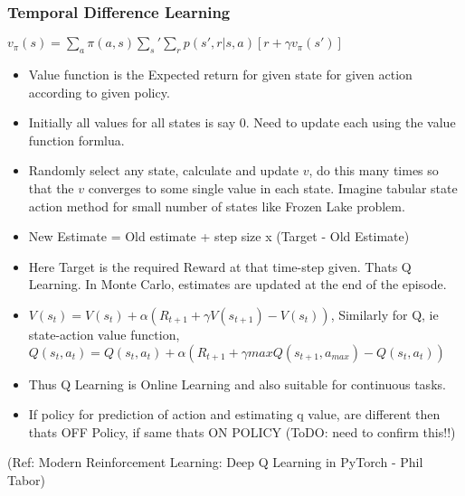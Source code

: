 \begin{frame}[fragile]\frametitle{Temporal Difference Learning}

$v_{\pi}(s) = \sum_a \pi(a,s) \sum_s' \sum_r p(s',r|s,a) [r + \gamma v_{\pi}(s')]$

\begin{itemize}
\item Value function is the Expected return for given state for given action according to given policy.
\item Initially all values for all states is say 0. Need to update each using the value function formlua.
\item Randomly select any state, calculate and update $v$, do this many times so that the $v$ converges to some single value in each state. Imagine tabular state action method for small number of states like Frozen Lake problem.
\item New Estimate = Old estimate + step size x (Target - Old Estimate)
\item Here Target is the required Reward at that time-step given. Thats Q Learning. In Monte Carlo, estimates are updated at the end of the episode.
\item $V(s_t) = V(s_t) + \alpha ( R_{t+1} + \gamma V(s_{t+1}) - V(s_t))$, Similarly for Q, ie state-action value function, $Q(s_t,a_t) = Q(s_t,a_t) + \alpha ( R_{t+1} + \gamma max Q(s_{t+1},a_{max}) - Q(s_t,a_t))$
\item Thus Q Learning is Online Learning  and also suitable for continuous tasks.
\item If policy for prediction of action and estimating q value, are different then thats OFF Policy, if same thats ON POLICY (ToDO: need to confirm this!!)
\end{itemize}

{\tiny (Ref: Modern Reinforcement Learning: Deep Q Learning in PyTorch - Phil Tabor)}

\end{frame}

